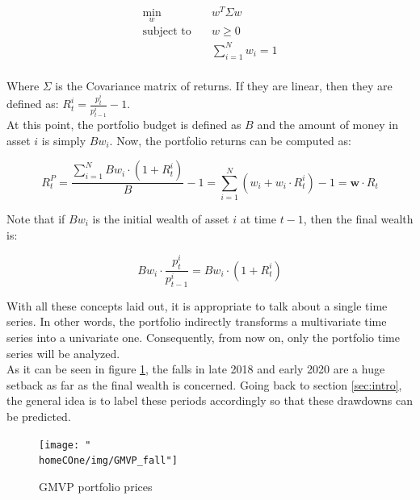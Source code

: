 \documentclass[a4paper]{article}
\newcommand{\homeCOne}{../../Chapter 1 - Metalabeling/Draft}
\begin{document}
\begin{equation}
	\begin{aligned}
		\min_{w} \quad & w^{T} \Sigma w\\
		\textrm{subject to} \quad & w \geq 0\\
 		 & \sum_{i = 1}^{N} w_i = 1    \\
	\end{aligned}
\end{equation}

Where $\Sigma$ is the Covariance matrix of returns. If they are 
linear, then they are defined as: $R_{t}^{i} = \frac{p_{t}^{i}}
{p_{t-1}^{i}} - 1$.\\

At this point, the portfolio budget is defined as $B$ and the amount 
of money in asset $i$ is simply $B w_i$. Now, the portfolio returns 
can be computed as:

\begin{equation}
	R_{t}^{P} = \frac{\sum_{i = 1}^{N} B w_i \cdot (1 + R_{t}^{i})}{B} - 1 =
	\sum_{i = 1}^{N} (w_i + w_i \cdot R_{t}^{i}) - 1 =
	\textbf{w} \cdot \textbf{$R_{t}$}
\end{equation}

Note that if $B w_i$ is the initial wealth of asset $i$ at time $t-1$, 
then the final wealth is:

\begin{equation}
	B w_i \cdot \frac{p_{t}^{i}}{p_{t-1}^{i}} = B w_i \cdot (1 + R_{t}^{i})
\end{equation}

With all these concepts laid out, it is appropriate to talk about a 
single time series. In other words, the portfolio indirectly 
transforms a multivariate time series into a univariate one. 
Consequently, from now on, only the portfolio time series will be 
analyzed.\\ 

As it can be seen in figure \ref{fig:GMVP_fall}, the falls in late 
2018 and early 2020 are a huge setback as far as the final wealth is 
concerned. Going back to section \ref{sec:intro}, the general idea is 
to label these periods accordingly so that these drawdowns can be 
predicted. \\

\begin{figure}[htbp]
	\centering
	\texttt{[image: "\\homeCOne/img/GMVP\_fall"]}
	\caption{GMVP portfolio prices}
	\label{fig:GMVP_fall}
\end{figure}
\end{document}
